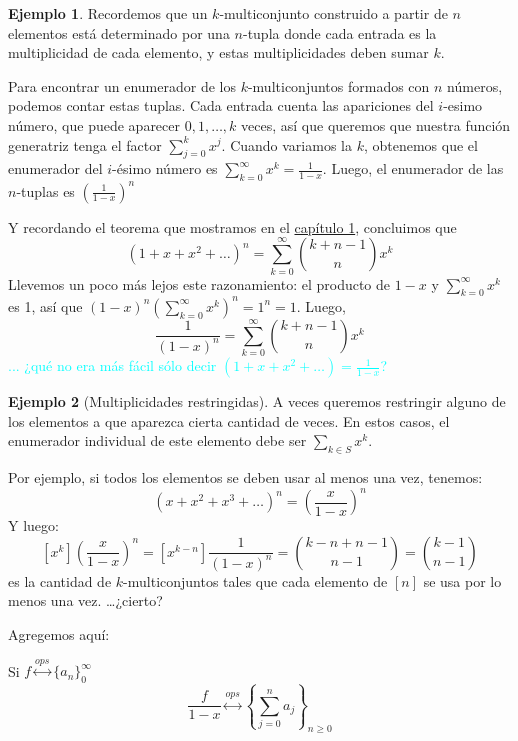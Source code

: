 \documentclass[spanish]{book}
\theoremstyle{definition}
\newtheorem*{ejem}{Ejemplo}
\begin{document}
\begin{ejem}
	Recordemos que un $k$-multiconjunto construido a partir de $n$ elementos está determinado por una $n$-tupla donde cada entrada es la multiplicidad de cada elemento, y estas multiplicidades deben sumar $k$. 
	
	Para encontrar un enumerador de los $k$-multiconjuntos formados con $n$ números, podemos contar estas tuplas. Cada entrada cuenta las apariciones del $i$-esimo número, que puede aparecer $0,1,\ldots,k$ veces, así que queremos que nuestra función generatriz tenga el factor $\sum_{j=0}^kx^j$. Cuando variamos la $k$, obtenemos que el enumerador del $i$-ésimo número es $\sum_{k=0}^\infty x^k=\frac{1}{1-x}$. Luego, el enumerador de las $n$-tuplas es $\left(\frac{1}{1-x}\right)^n$
	
	
%	
	
	Y recordando el teorema que mostramos en el \hyperref[chap:set-multiset]{capítulo 1}, concluimos que
	\[(1+x+x^2+\ldots)^n=\sum_{k=0}^\infty {k+n-1\choose n}x^k\]
	Llevemos un poco más lejos este razonamiento: el producto de $1-x$ y $\sum_{k=0}^\infty x^k$ es 1, así que $(1-x)^n\left(\sum_{k=0}^\infty x^k\right)^n=1^n=1$. Luego,
	\[\frac{1}{(1-x)^n}=\sum_{k=0}^\infty {k+n-1\choose n}x^k\]
	\textcolor{cyan}{... ¿qué no era más fácil sólo decir $(1+x+x^2+\ldots)=\frac{1}{1-x}$?}
\end{ejem}
\begin{ejem}[Multiplicidades restringidas]\label{restr}
	A veces queremos restringir alguno de los elementos a que aparezca cierta cantidad de veces. En estos casos, el enumerador individual de este elemento debe ser $\sum_{k\in S}x^k$.
	
	Por ejemplo, si todos los elementos se deben usar al menos una vez, tenemos:
	\[(x+x^2+x^3+\ldots)^n=\left(\frac{x}{1-x}\right)^n\]
	Y luego:
	\[[x^k]\left(\frac{x}{1-x}\right)^n=[x^{k-n}]\frac{1}{(1-x)^n}={k-n+n-1\choose n-1}={k-1\choose n-1}\]
	es la cantidad de $k$-multiconjuntos tales que cada elemento de $[n]$ se usa por lo menos una vez. …¿cierto?
\end{ejem}
Agregemos aquí:
\begin{teo}[Regla 5]\label{rule5}
	Si $f\overset{ops}{\longleftrightarrow}\{a_n\}_0^\infty$  \[\frac{f}{1-x}\overset{ops}{\longleftrightarrow}\left\{\sum_{j=0}^na_j\right\}_{n\geq0}\]
\end{teo}
\end{document}
